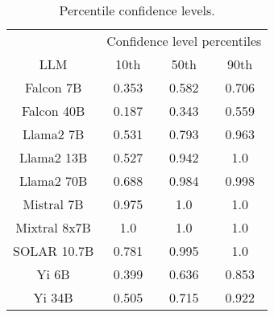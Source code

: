 \begin{table*}
\centering
\begin{tabular}{c|c|c|c}
& \multicolumn{3}{c}{Confidence level percentiles} \\ 
LLM & 10th & 50th & 90th\\ \hline
Falcon 7B & 0.353 & 0.582 & 0.706\\
Falcon 40B & 0.187 & 0.343 & 0.559\\
Llama2 7B & 0.531 & 0.793 & 0.963\\
Llama2 13B & 0.527 & 0.942 & 1.0\\
Llama2 70B & 0.688 & 0.984 & 0.998\\
Mistral 7B & 0.975 & 1.0 & 1.0\\
Mixtral 8x7B & 1.0 & 1.0 & 1.0\\
SOLAR 10.7B & 0.781 & 0.995 & 1.0\\
Yi 6B & 0.399 & 0.636 & 0.853\\
Yi 34B & 0.505 & 0.715 & 0.922\\
\hline
\end{tabular}
\caption{Percentile confidence levels.}
\label{tab:percentile_conf}
\end{table*}
